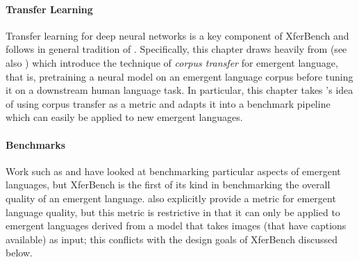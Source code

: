 \paragraph{Transfer Learning}
Transfer learning for deep neural networks is a key component of XferBench and follows in general tradition of \citet{zoph-etal-2016-transfer}.
Specifically, this chapter draws heavily from \citet{yao2022linking} (see also \citet{Papadimitriou2020LearningMH,artetxe-etal-2020-cross}) which introduce the technique of \emph{corpus transfer} for emergent language, that is, pretraining a neural model on an emergent language corpus before tuning it on a downstream human language task.
In particular, this chapter takes \citet{yao2022linking}'s idea of using corpus transfer as a metric and adapts it into a benchmark pipeline which can easily be applied to new emergent languages.

\paragraph{Benchmarks}
Work such as \citet{guo2023emergent} and \citet{perkins2022icy} have looked at benchmarking particular aspects of emergent languages, but XferBench is the first of its kind in benchmarking the overall quality of an emergent language.
\citet{yao2022linking} also explicitly provide a metric for emergent language quality, but this metric is restrictive in that it can only be applied to emergent languages derived from a model that takes images (that have captions available) as input; this conflicts with the design goals of XferBench discussed below.

